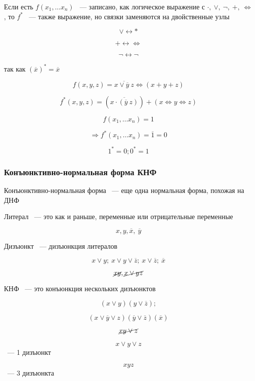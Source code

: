 \documentclass[russian]{lecture-notes}
\begin{document}
\begin{sloppypar}
\begin{corollary}
	Если есть $f(x_1, \dots x_n)$ ~--- записано, как логическое выражение с $\cdot, \: \lor, \: \neg, \: +, \: \Leftrightarrow$, то $f^*$ ~--- также выражение, но связки заменяются на двойственные узлы
	
	$$\lor \leftrightarrow *$$

	$$+ \leftrightarrow \Leftrightarrow$$
	
	$$\neg \leftrightarrow \neg$$
	
	так как $(\overline{x})^* = \overline{x}$
\end{corollary}

\begin{example}

	$$f(x, y, z) = \overline{x \lor \overline{y} \: z} \Leftrightarrow (x + y + z)$$
	
	$$f^*(x, y, z) = (\overline{x \cdot (\overline{y} \: z)}) + (x \Leftrightarrow y \Leftrightarrow z)$$
\end{example}

\begin{example}

	$$f(x_1, \dots x_n) = 1$$
	
	$$\Rightarrow f^*(x_1, \dots x_n) = \overline{1} = 0$$
	
	$$1^* = 0; 0^* = 1$$
\end{example}

\subsubsection{Конъюнктивно-нормальная форма КНФ}

\begin{definition}
	Конъюнктивно-нормальная форма ~--- еще одна нормальная форма, похожая на ДНФ
\end{definition}

\begin{definition}
	Литерал ~--- это как и раньше, переменные или отрицательные переменные
	
	$$x, y, \overline{x}, \: \overline{y}$$
\end{definition}

\begin{definition}
	Дизъюнкт ~--- дизъюнкция литералов
	
	$$x \lor y; \: x \lor y \lor \overline{z}; \: x \lor \overline{z}; \: \overline{x}$$
	
	$$\cancel{xy}, \cancel{x \lor yz}$$
\end{definition}

\begin{definition}
	КНФ ~--- это конъюнкция нескольких дизъюнктов
	
	$$(x \lor y)(y \lor \overline{z});$$
	
	$$(x \lor \overline{y} \lor z)(\overline{y} \lor \overline{z})(\overline{x})$$
	
	$$\cancel{xy \lor z}$$
	
	$$x \lor y \lor z$$ ~--- 1 дизъюнкт
	
	$$xyz$$ ~--- 3 дизъюнкта
\end{definition}

\end{sloppypar}
\end{document}
